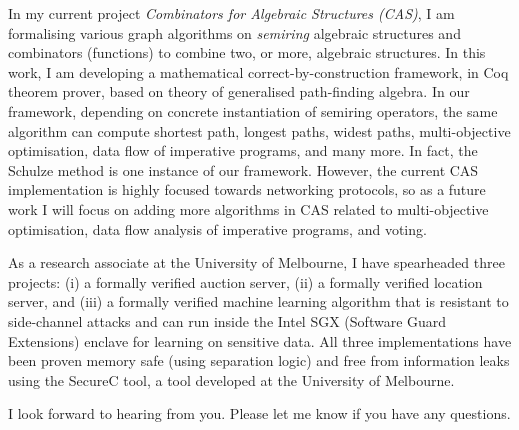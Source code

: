 \documentclass[11pt,a4paper,roman]{moderncv}
\begin{document}
\vspace{0.5cm}
In my current project \emph{Combinators for Algebraic Structures (CAS)},
I am formalising various graph algorithms on \emph{semiring} algebraic structures 
and combinators (functions) to 
combine two, or more, algebraic structures. In this work, I am developing 
a mathematical correct-by-construction  
framework, in Coq theorem prover, based on theory of generalised path-finding algebra. 
In our framework, depending on concrete instantiation 
of semiring operators, the same algorithm can compute shortest path, longest paths, 
widest paths, multi-objective optimisation, data flow of imperative programs, and many more. 
In fact, the Schulze method is one instance of our framework. However, 
the current CAS implementation is highly focused towards networking protocols,
so as a future work I will focus on adding more algorithms in CAS related 
to multi-objective optimisation, data flow analysis of imperative programs, and voting. 


As a research associate at the University of Melbourne, I have spearheaded three projects:
 (i) a formally verified auction server, (ii) a formally
 verified location server, and (iii) a formally verified machine learning 
 algorithm that is resistant to side-channel attacks and can  
 run inside the Intel SGX (Software Guard Extensions) enclave for learning
 on sensitive data. All three implementations have been proven 
 memory safe (using separation logic) and free from information
 leaks using the SecureC tool, a tool developed at the University of Melbourne.

I look forward to hearing from you. Please let me know if you have any questions. \\
 

\vspace{0.5cm}


\makeletterclosing
\end{document}
